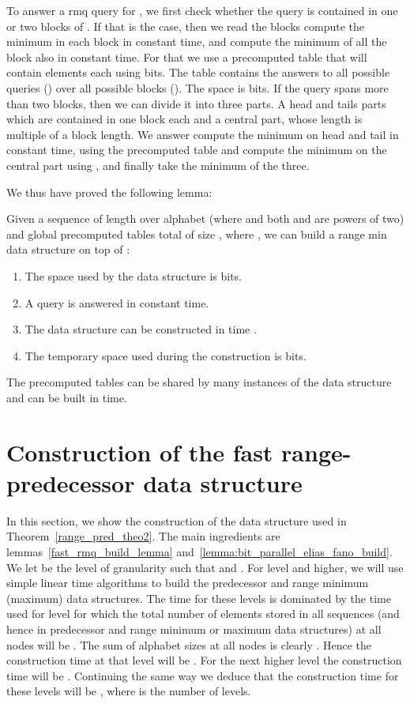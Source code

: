 \documentclass[11pt,runningheads]{llncs}
\begin{document}
{To answer a rmq query for , we first check whether the query is contained in one or two blocks of . If that is the case, then we read the blocks  compute the minimum in each block in constant time, and compute the minimum of all the  block also in constant time. For that we use a precomputed table that will contain  elements each using  bits. The table contains the answers to all possible queries () over all possible blocks (). 
The space is  bits. 
If the query spans more than two blocks, then we can divide it into three parts. A head and tails parts which are contained in one block each and a central part, whose length is multiple of a block length. We answer compute the minimum on head and tail 
in constant time, using the precomputed table and compute the minimum on the central part using , and finally take the minimum of the three. 

We thus have proved the following lemma: 
\begin{lemma}
\label{fast_rmq_build_lemma}
Given a sequence  of length  over alphabet  (where  and both  and  
are powers of two) and global precomputed tables total of size , where , we can build a range min data structure on top of : 
\begin{enumerate} 
\item The space used by the data structure is  bits. 
\item A query is answered in constant time. 
\item The data structure can be constructed in time . 
\item The temporary space used during the construction is  bits. 
\end{enumerate}
The precomputed tables can be shared by many instances of the data structure and can be built in  time. 
\end{lemma}
\section{Construction of the fast range-predecessor data structure}
In this section, we show the construction of the data structure used in Theorem~\ref{range_pred_theo2}. 
The main ingredients are lemmas~\ref{fast_rmq_build_lemma} and~\ref{lemma:bit_parallel_elias_fano_build}. 
We let  be the level of granularity  such that  and 
. For level  and higher, we will use simple linear time 
algorithms to build the predecessor and range minimum (maximum) data structures. The time for these levels 
is dominated by the time used for level  for which the total number of elements stored in all sequences (and hence in predecessor and range minimum or maximum data structures) at all nodes will be . The sum of alphabet sizes at all nodes is clearly . Hence the construction time at that level will be . For the next higher level the construction time will be . Continuing the same way we deduce that the construction time for these levels will be , 
where  is the number of levels. 

}
\end{document}
